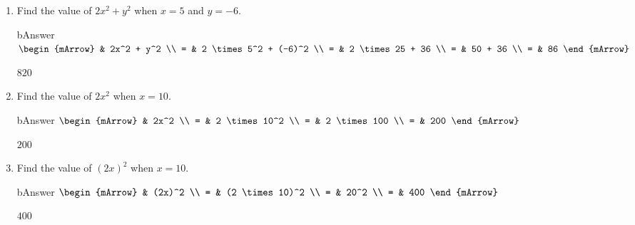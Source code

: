 \begin{enumerate}
  \item \begin{exercise} Find the value of $ 2x^2 + y^2$ when $x=5$ and $y=-6$.
        \begin{envOut}[height=6cm]{bAnswer}
		     $\begin{mArrow}
		        & 2x^2      + y^2            \\ 
              = & 2 \times 5^2 + (-6)^2      \\ 
              = & 2 \times 25 + 36     \\ 
              = & 50 + 36                       \\
              = & 86						  
	         \end{mArrow}$
        \end{envOut}			  
	    \begin{shortsolution}$820$\end{shortsolution}
	  \end{exercise}

  \item \begin{exercise} Find the value of $ 2x^2$ when $x=10$.
        \begin{envOut}[height=6cm]{bAnswer}
		     $\begin{mArrow}
		        & 2x^2            \\ 
              = & 2 \times 10^2      \\ 
              = & 2 \times 100     \\ 
              = & 200  					  
	         \end{mArrow}$
        \end{envOut}			  
	    \begin{shortsolution}$200$\end{shortsolution}
	  \end{exercise}


  \item \begin{exercise} Find the value of $ (2x)^2$ when $x=10$.
        \begin{envOut}[height=6cm]{bAnswer}
		     $\begin{mArrow}
		        & (2x)^2            \\ 
              = & (2 \times 10)^2      \\ 
              = & 20^2     \\ 
              = & 400  					  
	         \end{mArrow}$
        \end{envOut}			  
	    \begin{shortsolution}$400$\end{shortsolution}
	  \end{exercise}

\end{enumerate}

